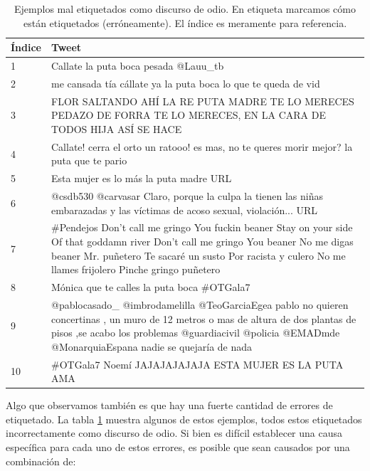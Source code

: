 \begin{table}[t]
    \small
    \centering
    \begin{tabularx}{\textwidth}{l X}
        Índice &  Tweet \\
        \hline
        1 &Callate la puta boca pesada @Lauu\_tb \\
        2 & me cansada tía cállate ya la puta boca lo que te queda de vid \\
        3   & FLOR SALTANDO AHÍ LA RE PUTA MADRE TE LO MERECES PEDAZO DE FORRA TE LO MERECES, EN LA CARA DE TODOS HIJA ASÍ SE HACE \\
        4   & Callate! cerra el orto un ratooo! es mas, no te queres morir mejor? la puta que te pario  \\
        5   & Esta mujer es lo más la puta madre URL\\
        6   & @csdb530 @carvasar Claro, porque la culpa la tienen las niñas embarazadas y las víctimas de acoso sexual, violación... URL \\
        7   & \#Pendejos Don't call me gringo You fuckin beaner Stay on your side Of that goddamn river Don't call me gringo You beaner No me digas beaner Mr. puñetero Te sacaré un susto Por racista y culero No me llames frijolero Pinche gringo puñetero \\
        8   & Mónica que te calles la puta boca \#OTGala7 \\
        9   & @pablocasado\_ @imbrodamelilla @TeoGarciaEgea pablo no quieren concertinas , un muro de 12 metros o mas de altura de dos plantas de pisos ,se acabo los problemas @guardiacivil @policia @EMADmde @MonarquiaEspana nadie se quejaría de nada \\
        10   & \#OTGala7 Noemí JAJAJAJAJAJA ESTA MUJER ES LA PUTA AMA \\
        \hline
    \end{tabularx}
    \caption{Ejemplos mal etiquetados como discurso de odio. En etiqueta marcamos cómo están etiquetados (erróneamente). El índice es meramente para referencia.}
    \label{tab:hateval_label_errors}
\end{table}


Algo que observamos también es que hay una fuerte cantidad de errores de etiquetado. La tabla \ref{tab:hateval_label_errors} muestra algunos de estos ejemplos, todos estos etiquetados incorrectamente como discurso de odio. Si bien es difícil establecer una causa específica para cada uno de estos errores, es posible que sean causados por una combinación de:


